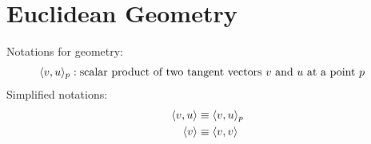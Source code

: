 \section{Euclidean Geometry}



Notations for geometry:
\begin{align}
\langle  v ,  u  \rangle_p  &:
\text{scalar product of two tangent vectors $ v $ and $ u $ at a point $ p $}
\end{align}
Simplified notations:
\begin{align}
\langle  v ,  u  \rangle  &\equiv  \langle  v ,  u  \rangle_p\\
\langle  v  \rangle       &\equiv  \langle  v ,  v  \rangle
\end{align}
